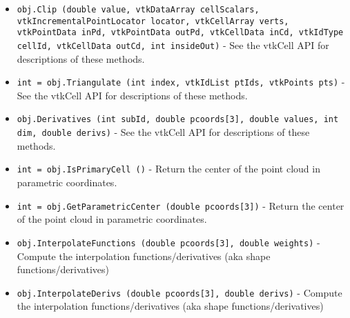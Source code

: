 \begin{itemize}
\item  \verb|obj.Clip (double value, vtkDataArray cellScalars, vtkIncrementalPointLocator locator, vtkCellArray verts, vtkPointData inPd, vtkPointData outPd, vtkCellData inCd, vtkIdType cellId, vtkCellData outCd, int insideOut)| -  See the vtkCell API for descriptions of these methods.

\item  \verb|int = obj.Triangulate (int index, vtkIdList ptIds, vtkPoints pts)| -  See the vtkCell API for descriptions of these methods.

\item  \verb|obj.Derivatives (int subId, double pcoords[3], double values, int dim, double derivs)| -  See the vtkCell API for descriptions of these methods.

\item  \verb|int = obj.IsPrimaryCell ()| -  Return the center of the point cloud in parametric coordinates.

\item  \verb|int = obj.GetParametricCenter (double pcoords[3])| -  Return the center of the point cloud in parametric coordinates.

\item  \verb|obj.InterpolateFunctions (double pcoords[3], double weights)| -  Compute the interpolation functions/derivatives
 (aka shape functions/derivatives)

\item  \verb|obj.InterpolateDerivs (double pcoords[3], double derivs)| -  Compute the interpolation functions/derivatives
 (aka shape functions/derivatives)

\end{itemize}
